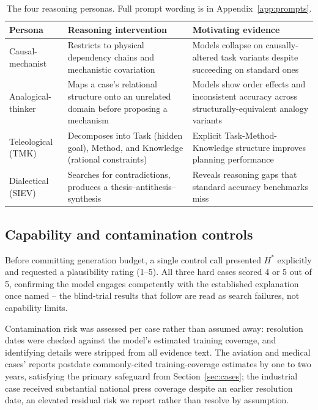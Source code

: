 \documentclass[11pt]{article}
\newcommand{\hstar}{H^{*}}
\begin{document}
\begin{table}[h]
\centering
\small
\begin{tabular}{@{}p{2.6cm}p{5.3cm}p{5.3cm}@{}}
\toprule
Persona & Reasoning intervention & Motivating evidence \\
\midrule
Causal-mechanist & Restricts to physical dependency chains and mechanistic covariation & Models collapse on causally-altered task variants despite succeeding on standard ones \citep{ullman2023} \\
Analogical-thinker & Maps a case's relational structure onto an unrelated domain before proposing a mechanism & Models show order effects and inconsistent accuracy across structurally-equivalent analogy variants \citep{lewis2024} \\
Teleological (TMK) & Decomposes into Task (hidden goal), Method, and Knowledge (rational constraints) & Explicit Task-Method-Knowledge structure improves planning performance \citep{goh2026} \\
Dialectical (SIEV) & Searches for contradictions, produces a thesis--antithesis--synthesis & Reveals reasoning gaps that standard accuracy benchmarks miss \citep{abbasloo2025} \\
\bottomrule
\end{tabular}
\caption{The four reasoning personas. Full prompt wording is in Appendix~\ref{app:prompts}.}
\label{tab:personas}
\end{table}

\subsection{Capability and contamination controls}
\label{sec:controls}

Before committing generation budget, a single control call presented
$\hstar$ explicitly and requested a plausibility rating (1--5). All three
hard cases scored 4 or 5 out of 5, confirming the model engages competently
with the established explanation once named -- the blind-trial results
that follow are read as search failures, not capability limits.

Contamination risk was assessed per case rather than assumed away:
resolution dates were checked against the model's estimated training
coverage, and identifying details were stripped from all evidence text.
The aviation and medical cases' reports postdate commonly-cited
training-coverage estimates by one to two years, satisfying the primary
safeguard from Section~\ref{sec:cases}; the industrial case received
substantial national press coverage despite an earlier resolution date, an
elevated residual risk we report rather than resolve by assumption.
\end{document}

